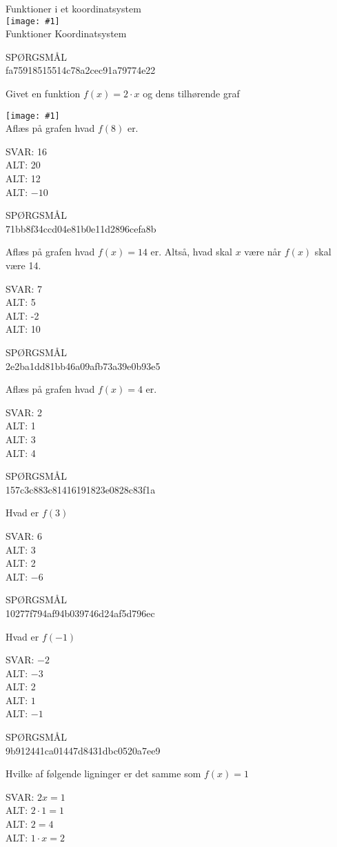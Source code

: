 \documentclass[]{article}
\newcounter{spgcounter}
\newenvironment{question}[2]{\addtocounter{spgcounter}{1} SPØRGSMÅL \thespgcounter\\}{\hspace{50px}}
\newcommand{\name}[1]{{\huge #1}\\}
\newcommand{\tag}[1]{#1}
\newcommand{\cover}[1]{\texttt{[image: \#1]}\\}
\newcommand{\image}[1]{\texttt{[image: \#1]}\\}
\newcommand{\answer}[1]{{\color{green} SVAR: #1}\\}
\newcommand{\alt}[1]{{\color{red} ALT: #1}\\}
\begin{document}
\name{Funktioner i et koordinatsystem}
\cover{funktionergrafkoordinat.png}
\tag{Funktioner}
\tag{Koordinatsystem}

\begin{question}{multi}\id{fa75918515514c78a2cec91a79774e22}
    
Givet en funktion $f(x)=2 \cdot x$ og dens tilhørende graf

\image{linearfunktion.png}

Aflæs på grafen hvad $f(8)$ er.

\answer{16}
\alt{20}
\alt{12}
\alt{$-10$}

\end{question}

\begin{question}{multi}\id{71bb8f34ccd04e81b0e11d2896cefa8b}
    
    Aflæs på grafen hvad $f(x)=14$ er. Altså, hvad skal $x$ være når $f(x)$ skal være 14.
    
    \answer{7}
    \alt{5}
    \alt{-2}
    \alt{10}
    
\end{question}

\begin{question}{multi}\id{2e2ba1dd81bb46a09afb73a39e0b93e5}
    
    Aflæs på grafen hvad $f(x)=4$ er.
    
    \answer{2}
    \alt{1}
    \alt{3}
    \alt{4}

\end{question}


\begin{question}{multi}\id{157c3c883c81416191823e0828c83f1a}

Hvad er $f(3)$

\answer{6}
\alt{3}
\alt{2}
\alt{$-6$}

\end{question}

\begin{question}{multi}\id{10277f794af94b039746d24af5d796ec}
    
Hvad er $f(-1)$

\answer{$-2$}
\alt{$-3$}
\alt{2}
\alt{$1$}
\alt{$-1$}

\end{question}

\begin{question}{multi}\id{9b912441ca01447d8431dbc0520a7ee9}
    
Hvilke af følgende ligninger er det samme som $f(x)=1$
    
\answer{$2x=1$}
\alt{$2\cdot 1 = 1$}
\alt{$2=4$}
\alt{$1 \cdot x=2$}
    
\end{question}
\end{document}

